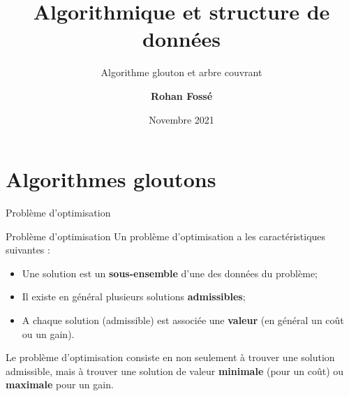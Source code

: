 \documentclass[10pt,xcolor=dvipsnames]{beamer}
\title{
Algorithmique et structure de données
}
\subtitle{Algorithme glouton et arbre couvrant}
\date{\centering 10 Novembre 2021}
\author{\centering \bf Rohan Fossé}
\newcommand{\defin}[1]{\textcolor{darkspringgreen}{#1}}
\begin{document}
\maketitle


\section{Algorithmes gloutons}

\begin{frame}{Problème d'optimisation}
\begin{exampleblock}{Problème d'optimisation}
 Un problème d'optimisation a les caractéristiques suivantes :
    \begin{itemize}
        \item Une solution est un \defin{\textbf{sous-ensemble}} d'une des données du problème;
        \item Il existe en général plusieurs solutions \defin{\textbf{admissibles}};
        \item A chaque solution (admissible) est associée une \defin{\textbf{valeur}} (en général un coût ou un gain).
    \end{itemize}
    Le problème d'optimisation consiste en non seulement à trouver une solution admissible, mais à trouver une solution de valeur \defin{\textbf{minimale}} (pour un coût) ou \defin{\textbf{maximale}} pour un gain.
    
\end{exampleblock}
   
\end{frame}
\end{document}
